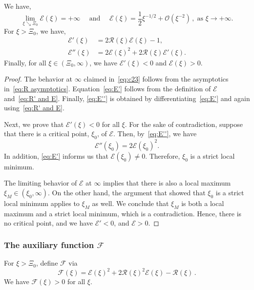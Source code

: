 \documentclass[AHL,Unicode,longabstracts]{cedram}
\newcommand{\mE}{\mathcal{E}}
\newcommand{\mF}{\mathcal{F}}
\newcommand{\mR}{\mathcal{R}}
\newcommand{\mO}{\mathcal{O}}
\newcommand{\1}{\mathds{1}}
\begin{document}
\begin{lemm}\label{lem:E}
We have,
\begin{equation}\label{eq:c23}
\lim_{\xi \searrow \Xi_0} \mE(\xi) =+\infty
\quad \text{ and } \quad
\mE(\xi) = \frac12 \xi^{-1/2} + \mO\left(\xi^{-2}\right)\,,\; \text{as }\xi \to +\infty.
\end{equation}
For $\xi>\Xi_0$, we have,
\begin{align}\label{eq:E'}
\mE'(\xi) &= 2\mR(\xi) \mE(\xi) - 1,\\
\mE''(\xi) &= 2 \mE(\xi)^2 + 2 \mR(\xi) \mE'(\xi). \label{eq:E''}
\end{align}
Finally, for all $\xi\in (\Xi_0, \infty)$, we have $\mE'(\xi)<0$ and $\mE(\xi)>0$.
\end{lemm}

\begin{proof}
The behavior at $\infty$ claimed in~\eqref{eq:c23} follows from the asymptotics in~\eqref{eq:R asymptotics}. Equation~\eqref{eq:E'} follows from the definition of $\mE$ and~\eqref{eq:R' and E}. Finally, \eqref{eq:E''} is obtained by differentiating~\eqref{eq:E'} and again using~\eqref{eq:R' and E}.


Next, we prove that $\mE'(\xi)<0$ for all $\xi$. For the sake of contradiction, suppose that there is a critical point, $\xi_0$, of $\mE$. Then, by~\eqref{eq:E''}, we have
\[
\mE''(\xi_0) = 2\mE(\xi_0)^2.
\]
In addition, \eqref{eq:E'} informs us that $\mE(\xi_0)\neq 0$. Therefore, $\xi_0$ is a strict local minimum.


The limiting behavior of $\mE$ at $\infty$ implies that there is also a local maximum $\xi_M\in (\xi_0,\infty)$. On the other hand, the argument that showed that $\xi_0$ is a strict local minimum applies to $\xi_M$ as well. We conclude that $\xi_M$ is both a local maximum and a strict local minimum, which is a contradiction. Hence, there is no critical point, and we have $\mE' < 0$, and $\mE>0$.
\end{proof}



\subsubsection{The auxiliary function \texorpdfstring{$\mF$}{mF}}

\begin{lemm}\label{lem:mF>0}
For $\xi>\Xi_0$, define $\mF$ via
\begin{equation}\label{eq:mF}
\mF(\xi) =
\mE(\xi)^2 + 2 \mR(\xi)^2 \mE(\xi) - \mR(\xi)\,.
\end{equation}
We have $\mF(\xi)>0$ for all $\xi$.
\end{lemm}
\end{document}
